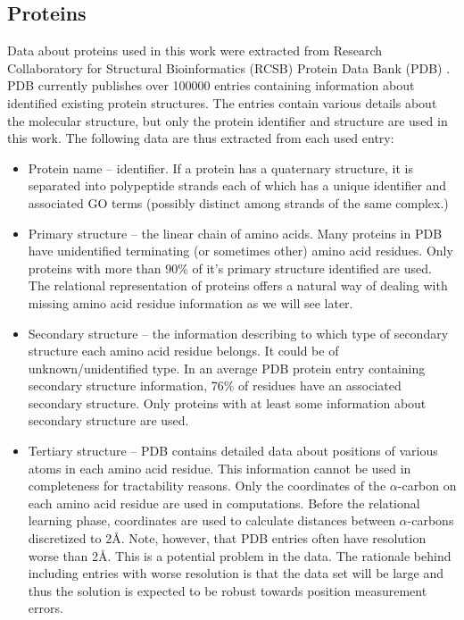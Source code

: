 \documentclass[11pt,twoside,a4paper]{book}
\begin{document}
\subsection{Proteins}
Data about proteins used in this work were extracted from Research Collaboratory for Structural Bioinformatics (RCSB) Protein Data Bank (PDB) \cite{pdb}.
PDB currently publishes over 100000 entries containing information about identified existing protein structures.
The entries contain various details about the molecular structure,
but only the protein identifier and structure are used in this work.
The following data are thus extracted from each used entry:
\begin{itemize}
 \item Protein name -- identifier. If a protein has a quaternary structure,
 it is separated into polypeptide strands each of which has a unique identifier and associated GO terms
 (possibly distinct among strands of the same complex.)
 \item Primary structure -- the linear chain of amino acids.
 Many proteins in PDB have unidentified terminating (or sometimes other) amino acid residues.
 Only proteins with more than 90\% of it's primary structure identified are used.
 The relational representation of proteins offers a natural way of dealing with missing amino
 acid residue information as we will see later.
 \item Secondary structure -- the information describing to which type of secondary structure each amino acid residue belongs.
 It could be of unknown/unidentified type. In an average PDB protein entry containing secondary structure information, 76\% of residues have an associated secondary structure.
 Only proteins with at least some information about secondary structure are used.
 \item Tertiary structure -- PDB contains detailed data about positions of various atoms in each amino acid residue.
 This information cannot be used in completeness for tractability reasons. 
 Only the coordinates of the $\alpha$-carbon on each amino acid residue are used in computations.
 Before the relational learning phase, coordinates are used to calculate distances between $\alpha$-carbons discretized to 2Å.
 Note, however, that PDB entries often have resolution worse than 2Å.
 This is a potential problem in the data.
 The rationale behind including entries with worse resolution is that the data set will be large and thus the solution
 is expected to be robust towards position measurement errors.
\end{itemize}
\end{document}
